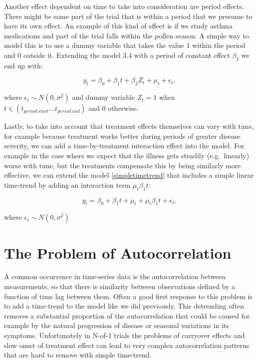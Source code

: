 \documentclass[12pt,a4paper,leqno]{report}
\theoremstyle{plain}
\theoremstyle{definition}
\theoremstyle{remark}
\begin{document}
Another effect dependent on time to take into consideration are period effects.
There might be some part of the trial that is within a period that we presume to
have its own effect. An example of this kind of effect is if we study asthma
medications and part of the trial falls within the pollen season. A simple way to model this
is to use a dummy variable that takes the value 1 within the period and 0 outside it.
Extending the model 3.4 with a period of constant effect \(\beta_2\) we end up with:

\begin{def}\label{}
\begin{equation}\label{}
y_t = \beta_0 + \beta_1 t + \beta_{2}Z_t + \mu_t + \epsilon_t,
\end{equation}
\end{def}where \(\epsilon_t \sim N(0,\sigma^2)\) and dummy variable \(Z_t = 1\)
when \(t \in (t_{period\,start} \ldots t_{period\,end}) \) and \(0\) otherwise.

Lastly, to take into account that treatment effects themselves can vary with time, for example because
treatment works better during periods of greater disease severity, we can add a time-by-treatment
interaction effect into the model. For example in the case where we expect that the
illness gets steadily (e.g.\ linearly) worse with time, but the treatments compensate this
by being similarly more effective, we can extend the model \ref{simpletimetrend} that
includes a simple linear time-trend by adding an interaction term \(\mu_t\beta_1 t\):

\begin{def}\label{}
\begin{equation}\label{}
y_t = \beta_0 + \beta_1 t + \mu_t + \mu_t\beta_1 t + \epsilon_t,
\end{equation}
\end{def}where \(\epsilon_t \sim N(0,\sigma^2)\)

\section{The Problem of Autocorrelation}\label{autocor}

A common occurrence in time-series data is the autocorrelation between
measurements, so that there is similarity between observations defined by
a function of time lag between them. Often a good first response to this problem
is to add a time-trend to the model like we did previously.
This detrending often removes a substantial proportion of the autocorrelation
that could be caused for example by the natural progression of disease or seasonal
variations in its symptoms\cite{stat}. Unfortunately in N-of-1 trials the problems
of carryover effects and slow onset of treatment effect can lead to very complex
autocorrelation patterns that are hard to remove with simple time-trend.
\end{document}
